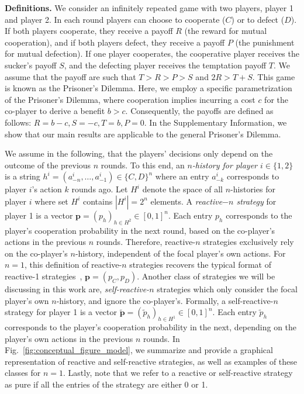\documentclass[11pt]{article}
\begin{document}
\textbf{Definitions.}
We consider an infinitely repeated game with two players, player 1 and player 2.
In each round players can choose to cooperate ($C$) or to defect ($D$). If
both players cooperate, they receive a payoff $R$ (the reward for mutual
cooperation), and if both players defect, they receive a payoff $P$ (the
punishment for mutual defection). If one player cooperates, the cooperative
player receives the sucker's payoff $S$, and the defecting player receives the
temptation payoff $T$. We assume that the payoff are such that $T > R > P > S$
and $2 R > T + S$. This game is known as the Prisoner's Dilemma. Here, we employ
a specific parametrization of the Prisoner's Dilemma, where cooperation implies
incurring a cost $c$ for the co-player to derive a benefit $b > c$.
Consequently, the payoffs are defined as follows: \(R = b - c, S = -c, T = b, P
= 0\). In the Supplementary Information, we show that our main results
are applicable to the general Prisoner's Dilemma.

We assume in the following, that the players' decisions only depend on the
outcome of the previous $n$ rounds. To this end, an {\it $n$-history for player
$i \in \{1, 2\}$} is a string $h^i=(a^i_{-n},\ldots,a^i_{-1})\!\in\!\{C,D\}^n$
where an entry $a^i_{-k}$ corresponds to player $i$'s action $k$ rounds ago. Let
$H^i$ denote the space of all $n$-histories for player $i$ where set $H^i$
contains $|H^i|=2^{n}$ elements. A {\it reactive$-n$ strategy} for player 1 is a
vector $\mathbf{p}=(p_h)_{h\in H^2} \in [0, 1]^{n}$. Each entry $p_h$
corresponds to the player's cooperation probability in the next round, based on
the co-player's actions in the previous $n$ rounds. Therefore, reactive-$n$
strategies exclusively rely on the co-player's $n$-history, independent of the
focal player's own actions. For \(n=1\), this definition of reactive-\(n\)
strategies recovers the typical format of reactive-1
strategies~\cite{baek:scientific:2016, wahl:JTB:1999, mcavoy:PRSA:2019},
\(\mathbf{p}=(p_C, p_D)\). Another class of strategies we will be discussing in
this work are, {\it self-reactive-$n$} strategies which only consider the focal
player's own $n$-history, and ignore the co-player's. Formally, a
self-reactive-$n$ strategy for player 1 is a vector $\mathbf{\tilde{p}} =
(\tilde{p}_h)_{h \in H^1} \in [0, 1] ^ {n}$. Each entry $\tilde{p}_h$
corresponds to the player's cooperation probability in the next, depending on
the player's own actions in the previous $n$ rounds.
In Fig.~\ref{fig:conceptual_figure_model}, we summarize and provide a graphical
representation of reactive and self-reactive strategies, as well as examples of
these classes for $n=1$. Lastly, note that we refer to a reactive or
self-reactive strategy as pure if all the entries of the strategy are either 0
or 1.
\end{document}
